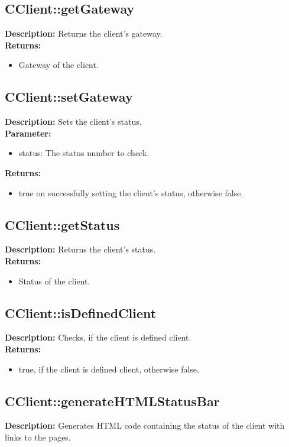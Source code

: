 \subsection{CClient::getGateway}
\textbf{Description:} Returns the client's gateway.\\
\textbf{Returns:}
\begin{itemize}
\item Gateway of the client.
\end{itemize}

\subsection{CClient::setGateway}
\textbf{Description:} Sets the client's status.\\
\textbf{Parameter:}
\begin{itemize}
\item status: The status number to check.
\end{itemize}
\textbf{Returns:}
\begin{itemize}
\item true on successfully setting the client's status, otherwise false.
\end{itemize}

\subsection{CClient::getStatus}
\textbf{Description:} Returns the client's status.\\
\textbf{Returns:}
\begin{itemize}
\item Status of the client.
\end{itemize}

\subsection{CClient::isDefinedClient}
\textbf{Description:} Checks, if the client is defined client.\\
\textbf{Returns:}
\begin{itemize}
\item true, if the client is defined client, otherwise false.
\end{itemize}

\subsection{CClient::generateHTMLStatusBar}
\textbf{Description:} Generates HTML code containing the status of the client with links to the pages.\\

